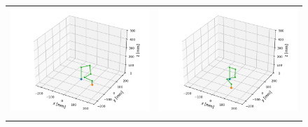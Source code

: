 \documentclass{ltjsarticle}
\begin{document}
\begin{figure}[H]
	\centering
	\begin{tabular}{cc}
		\begin{minipage}[c]{0.48\linewidth}
			\centering
			\includegraphics[width = 0.96\linewidth]{../results/program3_1.png}
			\subcaption{}
		\end{minipage}
		&
		\begin{minipage}[c]{0.48\linewidth}
			\centering
			\includegraphics[width = 0.96\linewidth]{../results/program3_2.png}
			\subcaption{}
		\end{minipage}
		\\
		\begin{minipage}[c]{0.48\linewidth}
			\centering

\end{minipage}
\end{tabular}
\end{figure}
\end{document}

